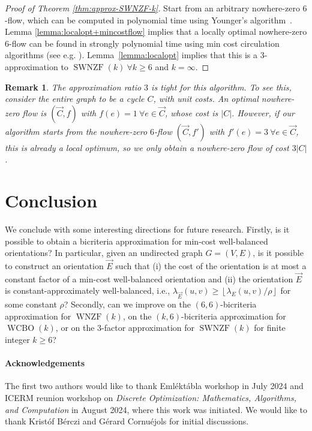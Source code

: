 \documentclass[11pt]{article}
\newtheorem{remark}{Remark}
\newcommand{\rounddown}[1]{\left\lfloor#1\right\rfloor}
\begin{document}
\begin{proof}[Proof of Theorem \ref{thm:approx-SWNZF-k}]
     Start from an arbitrary nowhere-zero $6$-flow, which can be computed in polynomial time using Younger's algorithm~\cite{younger1983integer}. Lemma \ref{lemma:localopt+mincostflow} implies that a locally optimal nowhere-zero $6$-flow can be found in strongly polynomial time using min cost circulation algorithms (see e.g. \cite{ford2015flows,chen2022maximum}). Lemma~\ref{lemma:localopt} implies that this is a $3$-approximation to $\operatorname{SWNZF}(k)\ \forall k\geq 6$ and $k=\infty$.
\end{proof}

\begin{remark}
    The approximation ratio $3$ is tight for this algorithm. To see this, consider the entire graph to be a cycle $C$, with unit costs. An optimal nowhere-zero flow is $(\vec{C},f)$ with $f(e)=1\ \forall e\in\vec{C}$, whose cost is $|C|$. However, if our algorithm starts from the nowhere-zero $6$-flow $(\vec{C},f')$ with $f'(e)=3\ \forall e\in\vec{C}$, this is already a local optimum, so we only obtain a nowhere-zero flow of cost $3|C|$.
\end{remark}



\section{Conclusion}
We conclude with some interesting directions for future research. Firstly, is it possible to obtain a bicriteria approximation for min-cost well-balanced orientations? In particular, given an undirected graph $G=(V, E)$, is it possible to construct an orientation $\vec{E}$ such that (i) the cost of the orientation is at most a constant factor of a min-cost well-balanced orientation and (ii) the orientation $\vec{E}$ is constant-approximately well-balanced, i.e., $\lambda_{\vec{E}}(u,v)\ge \rounddown{\lambda_E(u,v)/\rho}$ for some constant $\rho$? Secondly, can we improve on the $(6,6)$-bicriteria approximation for $\operatorname{WNZF}(k)$, on the $(k,6)$-bicriteria approximation for $\operatorname{WCBO}(k)$, or on the $3$-factor approximation for $\operatorname{SWNZF}(k)$ for finite integer $k\ge 6$?






\paragraph*{Acknowledgements} The first two authors would like to thank Eml\'ekt\'abla workshop in July 2024 and ICERM reunion workshop on \emph{Discrete Optimization: Mathematics, Algorithms, and Computation} in August 2024, where this work was initiated. We would like to thank Krist\'of B\'erczi and G\'erard Cornu\'ejols for initial discussions.



 
\end{document}
